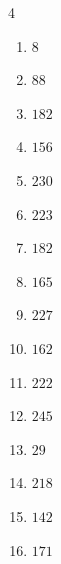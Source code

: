 \begin{multicols}{4}
\begin{enumerate}
  \item $8$


  \item $88$


  \item $182$


  \item $156$


  \item $230$


  \item $223$


  \item $182$


\columnbreak %

  \item $165$


  \item $227$


  \item $162$


  \item $222$


  \item $245$


  \item $29$


  \item $218$


  \item $142$


  \item $171$


\end{enumerate}
\end{multicols}
